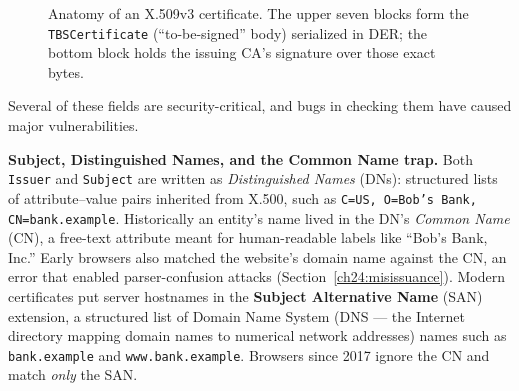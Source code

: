 \begin{figure}[htbp]
\centering
{}
\caption{Anatomy of an X.509v3 certificate. The upper seven blocks form the \texttt{TBSCertificate} (``to-be-signed'' body) serialized in DER; the bottom block holds the issuing CA's signature over those exact bytes.}
\label{fig:ch24-x509-anatomy}
\end{figure}

Several of these fields are security-critical, and bugs in checking them have caused major vulnerabilities.

\textbf{Subject, Distinguished Names, and the Common Name trap.} Both \texttt{Issuer} and \texttt{Subject} are written as \emph{Distinguished Names} (DNs): structured lists of attribute--value pairs inherited from X.500, such as \texttt{C=US, O=Bob's Bank, CN=bank.example}. Historically an entity's name lived in the DN's \emph{Common Name} (CN), a free-text attribute meant for human-readable labels like ``Bob's Bank, Inc.'' Early browsers also matched the website's domain name against the CN, an error that enabled parser-confusion attacks (Section~\ref{ch24:misissuance}). Modern certificates put server hostnames in the \textbf{Subject Alternative Name} (SAN) extension, a structured list of Domain Name System (DNS --- the Internet directory mapping domain names to numerical network addresses) names such as \texttt{bank.example} and \texttt{www.bank.example}. Browsers since 2017 ignore the CN and match \emph{only} the SAN.

